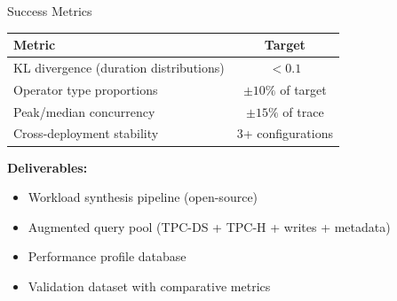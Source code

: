 \documentclass[aspectratio=169]{beamer}
\begin{document}
\begin{frame}{Success Metrics}
    \begin{table}
        \centering
        \begin{tabular}{lc}
            \toprule
            \textbf{Metric} & \textbf{Target} \\
            \midrule
            KL divergence (duration distributions) & $< 0.1$ \\
            Operator type proportions & $\pm 10\%$ of target \\
            Peak/median concurrency & $\pm 15\%$ of trace \\
            Cross-deployment stability & 3+ configurations \\
            \bottomrule
        \end{tabular}
    \end{table}
    
    \vspace{0.3cm}
    \textbf{Deliverables:}
    \begin{itemize}
        \item Workload synthesis pipeline (open-source)
        \item Augmented query pool (TPC-DS + TPC-H + writes + metadata)
        \item Performance profile database
        \item Validation dataset with comparative metrics
    \end{itemize}
\end{frame}
\end{document}
